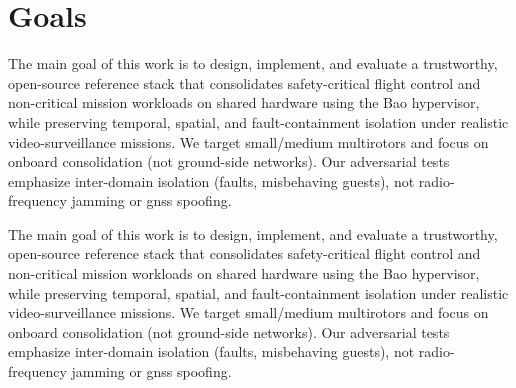 \section{Goals}
The main goal of this work is to design, implement, and evaluate a trustworthy,
open-source reference stack that consolidates safety-critical flight control and
non-critical mission workloads on shared hardware using the Bao hypervisor,
while preserving temporal, spatial, and fault-containment isolation under
realistic video-surveillance missions. We target small/medium multirotors and
focus on onboard consolidation (not ground-side networks). Our adversarial tests
emphasize inter-domain isolation (faults, misbehaving guests), not radio-frequency
jamming or \gls{gnss} spoofing.

The main goal of this work is to design, implement, and evaluate a trustworthy,
open-source reference stack that consolidates safety-critical flight control and
non-critical mission workloads on shared hardware using the Bao hypervisor,
while preserving temporal, spatial, and fault-containment isolation under
realistic video-surveillance missions. We target small/medium multirotors and
focus on onboard consolidation (not ground-side networks). Our adversarial tests
emphasize inter-domain isolation (faults, misbehaving guests), not radio-frequency
jamming or \gls{gnss} spoofing.

